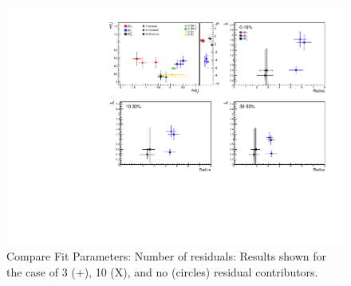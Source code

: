 \documentclass[/home/jesse/Analysis/FemtoAnalysis/AnalysisNotes/AnalysisNoteJBuxton.tex]{subfiles}
\begin{document}
\begin{figure}[h]
  \centering
  \includegraphics[width=\textwidth]{7_ResultsAndDiscussion/Figures/CompareAllScattParams_CompNumRes_StatOnly.pdf}
  \caption[Compare Fit Parameters: Number of residuals]{Compare Fit Parameters: Number of residuals: Results shown for the case of 3 (+), 10 (X), and no (circles) residual contributors.}
  \label{fig:CompareAllScattParams_CompNumRes}
\end{figure}
\end{document}
